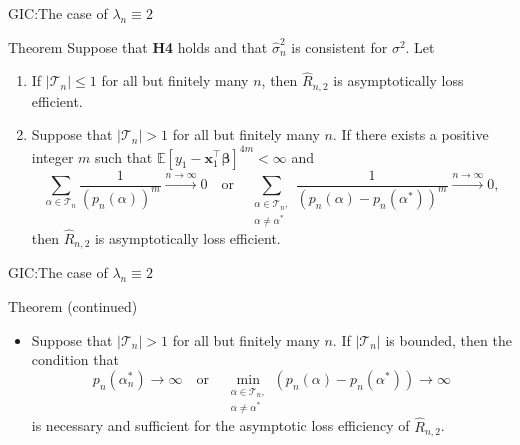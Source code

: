 \documentclass{beamer}
\newcommand{\0}{\emptyset}
\newcommand{\prob}{\mathbb{P}}
\newcommand{\Ep}[1]{\mathbb{E}\left[ #1 \right]}
\newcommand{\paren}[1]{\left(#1 \right)}
\newcommand{\set}[1]{\left\{ #1 \right\}}
\newcommand{\norm}[1]{|\hspace{-1pt}|#1 |\hspace{-1pt}|}
\newcommand{\normsq}[1]{\norm{#1}^{2}}
\newcommand{\Acal}{\mathcal{A}_{n}}
\newcommand{\Tcal}{\mathcal{T}_{n}}
\newcommand{\x}{\boldsymbol{x}}
\newcommand{\e}{\boldsymbol{e}}
\newcommand{\bbeta}{\boldsymbol{\beta}}
\newcommand{\sigmahat}{\hat{\sigma}^{2}_{n}}
\newcommand{\1}{\mathmybb{1}}
\begin{document}
\begin{frame}{GIC:\@ The case of \(\lambda_{n} \equiv 2\)}
  
\begin{block}{Theorem}
  Suppose that \textbf{H4} holds and that \(\sigmahat\) is consistent for \(\sigma^{2}\). Let 
    \begin{enumerate}
        \item If \(|\Tcal|\leq1\) for all but finitely many \(n\), then \(\hat{R}_{n,2}\) is asymptotically loss efficient.
        \item Suppose that \(|\Tcal|> 1\) for all but finitely many \(n\). If there exists a positive integer \(m\) such that \(\Ep{y_{1} - \x_{1}^{\top}\bbeta}^{4m}<\infty\) and 
        \begin{equation}\label{eq:conditionsums}
            \sum_{\alpha\in\Tcal}\frac{1}{\paren{p_{n}(\alpha)}^{m}}\xrightarrow{n\to\infty} 0 \quad\text{or}\quad \sum_{\substack{\alpha\in\Tcal,\\ \alpha\neq\alpha^{*}}}\frac{1}{\paren{p_{n}(\alpha) - p_{n}(\alpha^{*})}^{m}}\xrightarrow{n\to\infty} 0,
        \end{equation}
        then \(\hat{R}_{n,2}\) is asymptotically loss efficient.
        
    \end{enumerate}
\end{block}
\end{frame}

\begin{frame}{GIC:\@ The case of \(\lambda_{n} \equiv 2\)}
  
\begin{block}{Theorem (continued)}
    \begin{itemize}
        \item Suppose that \(|\Tcal|>1\) for all but finitely many \(n\). 
        If \(|\Tcal|\) is bounded,
        then the condition that
        \begin{equation}
            \label{eq:conditionP}
            p_{n}(\alpha^{*}_{n})\to\infty\quad\text{or}\quad \min_{\substack{\alpha\in\Tcal,\\ \alpha\neq\alpha^{*}}}\paren{p_{n}(\alpha) - p_{n}(\alpha^{*})}\to\infty
        \end{equation}
        is necessary and sufficient for the asymptotic loss efficiency of \(\hat{R}_{n,2}\).
    \end{itemize}
\end{block}
\end{frame}
\end{document}
